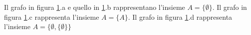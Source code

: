 \begin{example}
\begin{figure}[t]
\begin{subfigure}{.25\textwidth}
            \caption{}
          \end{subfigure}

        \caption{}
        \label{fig:graph_set}
    \end{figure}

    Il grafo in figura \ref*{fig:graph_set}.a e quello in \ref*{fig:graph_set}.b rappresentano l'insieme $A = \{\emptyset\}$.
    Il grafo in figura \ref*{fig:graph_set}.c rappresenta l'insieme $A = \{A\}$.
    Il grafo in figura \ref*{fig:graph_set}.d rappresenta l'insieme $A = \{\emptyset, \{\emptyset\}\}$
\end{example}

